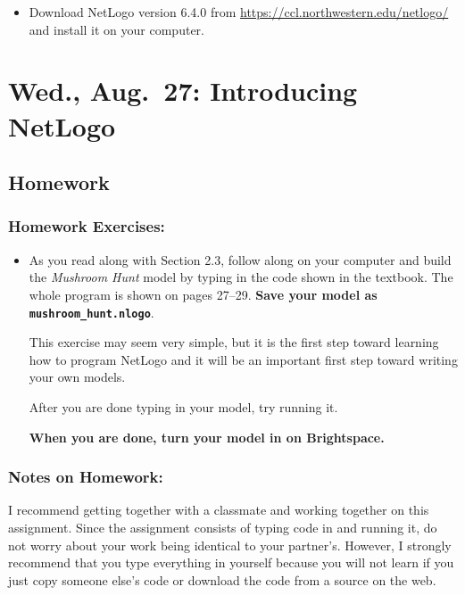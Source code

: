 \documentclass[
]{article}
\providecommand{\tightlist}{%
  \setlength{\itemsep}{0pt}\setlength{\parskip}{0pt}}
\begin{document}
\begin{itemize}
\tightlist
\item
  Download NetLogo version 6.4.0 from
  \url{https://ccl.northwestern.edu/netlogo/} and install it on your
  computer.
\end{itemize}

\section{Wed., Aug.~27: Introducing
NetLogo}\label{wed.-aug.-27-introducing-netlogo}

\subsection{Homework}\label{homework-1}

\subsubsection{Homework Exercises:}\label{homework-exercises-1}

\begin{itemize}
\item
  As you read along with Section 2.3, follow along on your computer and
  build the \emph{Mushroom Hunt} model by typing in the code shown in
  the textbook. The whole program is shown on pages 27--29. \textbf{Save
  your model as \texttt{mushroom\_hunt.nlogo}}.

  This exercise may seem very simple, but it is the first step toward
  learning how to program NetLogo and it will be an important first step
  toward writing your own models.

  After you are done typing in your model, try running it.

  \textbf{When you are done, turn your model in on Brightspace.}
\end{itemize}

\subsubsection{Notes on Homework:}\label{notes-on-homework}

I recommend getting together with a classmate and working together on
this assignment. Since the assignment consists of typing code in and
running it, do not worry about your work being identical to your
partner's. However, I strongly recommend that you type everything in
yourself because you will not learn if you just copy someone else's code
or download the code from a source on the web.
\end{document}
